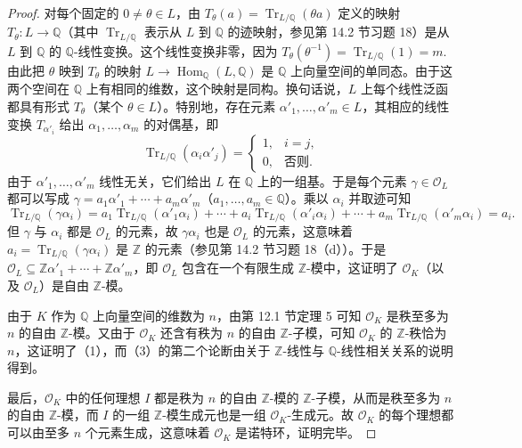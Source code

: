 \begin{proof}
对每个固定的 \(0 \neq \theta \in L\)，由 \(T_\theta(a) = \operatorname{Tr}_{L/\mathbb{Q}}(\theta a)\) 定义的映射 \(T_\theta : L \to \mathbb{Q}\)（其中 \(\operatorname{Tr}_{L/\mathbb{Q}}\) 表示从 \(L\) 到 \(\mathbb{Q}\) 的迹映射，参见第 14.2 节习题 18）是从 \(L\) 到 \(\mathbb{Q}\) 的 \(\mathbb{Q}\)-线性变换。这个线性变换非零，因为 \(T_\theta(\theta^{-1}) = \operatorname{Tr}_{L/\mathbb{Q}}(1) = m\). 由此把 \(\theta\) 映到 \(T_\theta\) 的映射 \(L \to \operatorname{Hom}_{\mathbb{Q}}(L, \mathbb{Q})\) 是 \(\mathbb{Q}\) 上向量空间的单同态。由于这两个空间在 \(\mathbb{Q}\) 上有相同的维数，这个映射是同构。换句话说，\(L\) 上每个线性泛函都具有形式 \(T_\theta\)（某个 \(\theta \in L\)）。特别地，存在元素 \(\alpha'_1, \ldots, \alpha'_m \in L\)，其相应的线性变换 \(T_{\alpha'_i}\) 给出 \(\alpha_1, \ldots, \alpha_m\) 的对偶基，即
\[
\operatorname{Tr}_{L/\mathbb{Q}}(\alpha_i\alpha'_j) = \begin{cases} 1, & i = j,\\ 0, & \text{否则}.\end{cases}
\]
由于 \(\alpha'_1, \ldots, \alpha'_m\) 线性无关，它们给出 \(L\) 在 \(\mathbb{Q}\) 上的一组基。于是每个元素 \(\gamma \in \mathcal{O}_L\) 都可以写成 \(\gamma = a_1\alpha'_1+\cdots+a_m\alpha'_m\)（\(a_1, \ldots, a_m \in \mathbb{Q}\)）。乘以 \(\alpha_i\) 并取迹可知
\[
\operatorname{Tr}_{L/\mathbb{Q}}(\gamma\alpha_i) = a_1\operatorname{Tr}_{L/\mathbb{Q}}(\alpha'_1\alpha_i)+\cdots+a_i\operatorname{Tr}_{L/\mathbb{Q}}(\alpha'_i\alpha_i)+\cdots+a_m\operatorname{Tr}_{L/\mathbb{Q}}(\alpha'_m\alpha_i) = a_i.
\]
但 \(\gamma\) 与 \(\alpha_i\) 都是 \(\mathcal{O}_L\) 的元素，故 \(\gamma\alpha_i\) 也是 \(\mathcal{O}_L\) 的元素，这意味着 \(a_i = \operatorname{Tr}_{L/\mathbb{Q}}(\gamma\alpha_i)\) 是 \(\mathbb{Z}\) 的元素（参见第 14.2 节习题 18（d））。于是 \(\mathcal{O}_L \subseteq \mathbb{Z}\alpha'_1+\cdots+\mathbb{Z}\alpha'_m\)，即 \(\mathcal{O}_L\) 包含在一个有限生成 \(\mathbb{Z}\)-模中，这证明了 \(\mathcal{O}_K\)（以及 \(\mathcal{O}_L\)）是自由 \(\mathbb{Z}\)-模。

由于 \(K\) 作为 \(\mathbb{Q}\) 上向量空间的维数为 \(n\)，由第 12.1 节定理 5 可知 \(\mathcal{O}_K\) 是秩至多为 \(n\) 的自由 \(\mathbb{Z}\)-模。又由于 \(\mathcal{O}_K\) 还含有秩为 \(n\) 的自由 \(\mathbb{Z}\)-子模，可知 \(\mathcal{O}_K\) 的 \(\mathbb{Z}\)-秩恰为 \(n\)，这证明了（1），而（3）的第二个论断由关于 \(\mathbb{Z}\)-线性与 \(\mathbb{Q}\)-线性相关关系的说明得到。

最后，\(\mathcal{O}_K\) 中的任何理想 \(I\) 都是秩为 \(n\) 的自由 \(\mathbb{Z}\)-模的 \(\mathbb{Z}\)-子模，从而是秩至多为 \(n\) 的自由 \(\mathbb{Z}\)-模，而 \(I\) 的一组 \(\mathbb{Z}\)-模生成元也是一组 \(\mathcal{O}_K\)-生成元。故 \(\mathcal{O}_K\) 的每个理想都可以由至多 \(n\) 个元素生成，这意味着 \(\mathcal{O}_K\) 是诺特环，证明完毕。
\end{proof}


